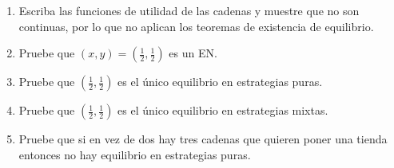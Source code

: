 \documentclass[11pt, spanish]{article}
\theoremstyle{plain}
\begin{document}
\begin{itemize}
  \begin{enumerate}
    \item Escriba las funciones de utilidad de las cadenas y muestre que no
      son continuas, por lo que no aplican los teoremas de existencia de equilibrio.
    \item Pruebe que $(x,y)= (\frac{1}{2},\frac{1}{2})$ es un EN.
    \item Pruebe que $(\frac{1}{2},\frac{1}{2})$ es el único equilibrio
      en estrategias puras.
    \item Pruebe que $(\frac{1}{2},\frac{1}{2})$ es el único equilibrio en
      estrategias mixtas.
    \item Pruebe que si en vez de dos hay tres cadenas que quieren poner una tienda
      entonces no hay equilibrio en estrategias puras.
  \end{enumerate}

\end{itemize}
\end{document}
